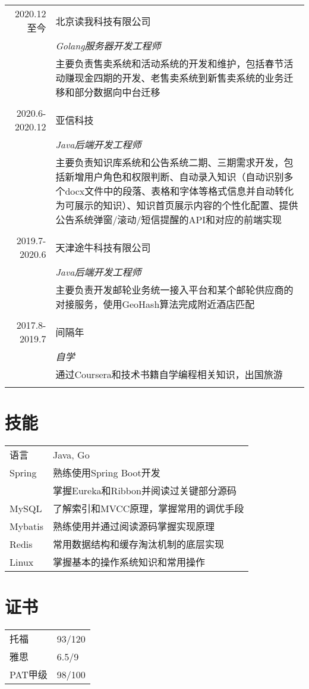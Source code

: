 \documentclass[11pt,a4paper]{article}
\begin{document}
\noindent\begin{tabular}{r|p{9.5cm}}
\textsc{2020.12至今} 
	& \textsc{北京读我科技有限公司}\\
	&\emph{Golang服务器开发工程师}\\

	&主要负责售卖系统和活动系统的开发和维护，包括春节活动赚现金四期的开发、老售卖系统到新售卖系统的业务迁移和部分数据向中台迁移\\
\multicolumn{2}{c}{} \\


\textsc{2020.6-2020.12} 
	& \textsc{亚信科技}\\
	&\emph{Java后端开发工程师}\\

	&主要负责知识库系统和公告系统二期、三期需求开发，包括新增用户角色和权限判断、自动录入知识（自动识别多个docx文件中的段落、表格和字体等格式信息并自动转化为可展示的知识）、知识首页展示内容的个性化配置、提供公告系统弹窗/滚动/短信提醒的API和对应的前端实现\\
\multicolumn{2}{c}{} \\


\textsc{2019.7-2020.6} 
	& \textsc{天津途牛科技有限公司}\\
	&\emph{Java后端开发工程师}\\
	
	&主要负责开发邮轮业务统一接入平台和某个邮轮供应商的对接服务，使用GeoHash算法完成附近酒店匹配\\
\multicolumn{2}{c}{} \\

\textsc{2017.8-2019.7} 
	& \textsc{间隔年}\\
	&\emph{自学}\\
	
	&通过Coursera和技术书籍自学编程相关知识，出国旅游\\
\multicolumn{2}{c}{} \\
\end{tabular}

\newpage

\section{技能}\noindent
\begin{tabular}{p{6cm} l}
	语言
		& Java, Go\\ 
	Spring 
		& 熟练使用Spring Boot开发\\
		& 掌握Eureka和Ribbon并阅读过关键部分源码\\
	MySQL 
		& 了解索引和MVCC原理，掌握常用的调优手段\\
	Mybatis 
		& 熟练使用并通过阅读源码掌握实现原理\\
	Redis 
		& 常用数据结构和缓存淘汰机制的底层实现\\
	Linux
		& 掌握基本的操作系统知识和常用操作\\
\end{tabular}

\section{证书}
\noindent\begin{tabular}{p{7cm} l}
	托福  & 93/120\\
	雅思  & 6.5/9\\
	PAT甲级 & 98/100\\
\end{tabular}
\end{document}
